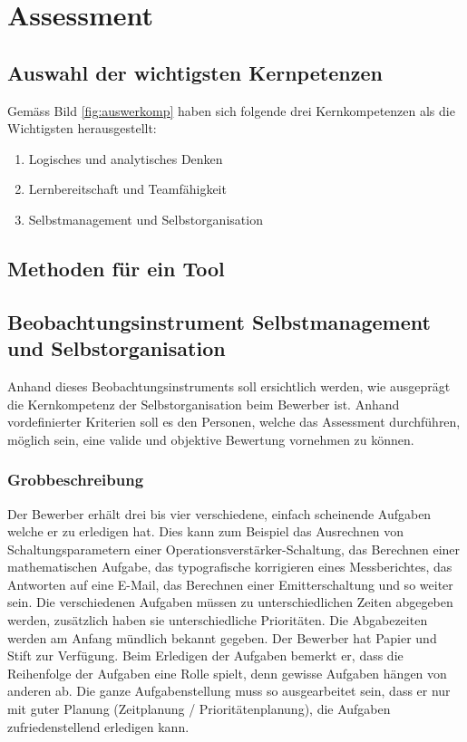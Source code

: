 \chapter{Assessment}

\section{Auswahl der wichtigsten Kernpetenzen}

Gemäss Bild \ref{fig:auswerkomp} haben sich folgende drei Kernkompetenzen als die Wichtigsten herausgestellt:

\begin{enumerate} 
\item{Logisches und analytisches Denken}
\item{Lernbereitschaft und Teamfähigkeit}
\item{Selbstmanagement und Selbstorganisation}
\end{enumerate}

\section{Methoden für ein Tool}

\section{Beobachtungsinstrument Selbstmanagement und Selbstorganisation}

Anhand dieses Beobachtungsinstruments soll ersichtlich werden, wie ausgeprägt die Kernkompetenz der Selbstorganisation beim Bewerber ist. Anhand vordefinierter Kriterien soll es den Personen, welche das Assessment durchführen, möglich sein, eine valide und objektive Bewertung vornehmen zu können.

\subsection{Grobbeschreibung}

Der Bewerber erhält drei bis vier verschiedene, einfach scheinende Aufgaben welche er zu erledigen hat. Dies kann zum Beispiel das Ausrechnen von Schaltungsparametern einer Operationsverstärker-Schaltung, das Berechnen einer
mathematischen Aufgabe, das typografische korrigieren eines Messberichtes, das Antworten auf eine E-Mail, das Berechnen einer Emitterschaltung und so weiter sein. Die verschiedenen Aufgaben müssen zu unterschiedlichen Zeiten abgegeben werden, zusätzlich haben sie unterschiedliche Prioritäten. Die Abgabezeiten werden am Anfang mündlich bekannt gegeben. Der Bewerber hat Papier und Stift zur Verfügung.
Beim Erledigen der Aufgaben bemerkt er, dass die Reihenfolge der Aufgaben eine Rolle spielt, denn gewisse Aufgaben hängen von anderen ab. Die ganze Aufgabenstellung muss so ausgearbeitet sein, dass er nur mit
guter Planung (Zeitplanung / Prioritätenplanung), die Aufgaben zufriedenstellend erledigen kann.



